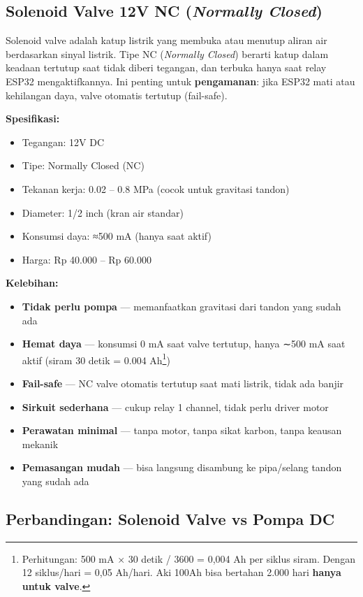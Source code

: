 \documentclass[12pt,a4paper,oneside]{report}
\begin{document}
\subsection{Solenoid Valve 12V NC (\textit{Normally Closed})}

Solenoid valve adalah katup listrik yang membuka atau menutup aliran air berdasarkan sinyal listrik. Tipe NC (\textit{Normally Closed}) berarti katup dalam keadaan tertutup saat tidak diberi tegangan, dan terbuka hanya saat relay ESP32 mengaktifkannya. Ini penting untuk \textbf{pengamanan}: jika ESP32 mati atau kehilangan daya, valve otomatis tertutup (fail-safe).

\textbf{Spesifikasi:}
\begin{itemize}
    \item Tegangan: 12V DC
    \item Tipe: Normally Closed (NC)
    \item Tekanan kerja: 0.02 -- 0.8 MPa (cocok untuk gravitasi tandon)
    \item Diameter: 1/2 inch (kran air standar)
    \item Konsumsi daya: ≈500 mA (hanya saat aktif)
    \item Harga: Rp 40.000 -- Rp 60.000
\end{itemize}

\textbf{Kelebihan:}
\begin{itemize}
    \item \textbf{Tidak perlu pompa} — memanfaatkan gravitasi dari tandon yang sudah ada
    \item \textbf{Hemat daya} — konsumsi 0 mA saat valve tertutup, hanya ∼500 mA saat aktif (siram 30 detik = 0.004 Ah\footnote{Perhitungan: 500 mA × 30 detik / 3600 = 0,004 Ah per siklus siram. Dengan 12 siklus/hari = 0,05 Ah/hari. Aki 100Ah bisa bertahan 2.000 hari \textbf{hanya untuk valve}.})
    \item \textbf{Fail-safe} — NC valve otomatis tertutup saat mati listrik, tidak ada banjir
    \item \textbf{Sirkuit sederhana} — cukup relay 1 channel, tidak perlu driver motor
    \item \textbf{Perawatan minimal} — tanpa motor, tanpa sikat karbon, tanpa keausan mekanik
    \item \textbf{Pemasangan mudah} — bisa langsung disambung ke pipa/selang tandon yang sudah ada
\end{itemize}

\subsection{Perbandingan: Solenoid Valve vs Pompa DC}
\end{document}
